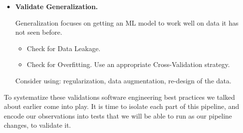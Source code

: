 \begin{itemize}
    \noindent
    If we have chosen our model appropriately, it
    should have the capacity to learn from our
    dataset.

    Some cases of mismatch can be more elusive
    and lead to silent failure
    \footnote{
        A pipeline fed values that are not in the
        correct range or shape may still run but
        would produce a poorly performing model.
        Models that require normalized data will
        often still train on nonnormalized data:
        they simply will not be able to fit it in
        a useful manner. Similarly, feeding a matrix
        of the wrong shape to a model can cause
        it to misinterpret the input and produce
        incorrect outputs.
    }.
    Catching silent failure errors is harder, because
    they silent failures manifest later in the process
    once we evaluate the performance of a model. The
    best way to proactively detect them is to visualize
    data as you build your pipeline and build tests to
    encode assumptions.

    Test that after the data processing, the model is able
    to train. Check the learning curve of the model.


    \item \textbf{Validate Generalization.}
    
    \noindent
    Generalization focuses on getting an ML model to work
    well on data it has not seen before.

    \begin{itemize}
        \item Check for Data Leakage.
        
        \item Check for Overfitting. Use an appropriate
        Cross-Validation strategy.
    \end{itemize}

    Consider using: regularization, data augmentation,
    re-design of the data.
\end{itemize}

To systematize these validations software engineering
best practices we talked about earlier come into play.
It is time to isolate each part of this pipeline, and
encode our observations into tests that we will be able
to run as our pipeline changes, to validate it.







